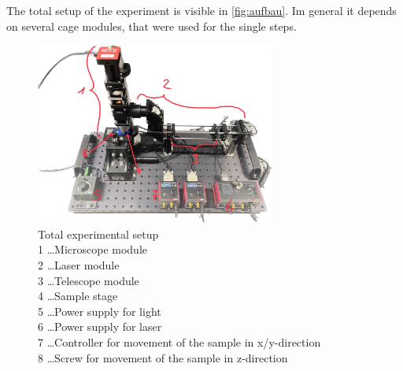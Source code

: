 \documentclass[12pt,english,ngerman]{scrartcl}
\begin{document}
The total setup of the experiment is visible in \autoref{fig:aufbau}. Im
general it depends on several cage modules, that were used for the single
steps.

\begin{figure}[H]
	\begin{center}
		\includegraphics[width =0.7\textwidth]{./figures/aufbau.jpg}
	\end{center}
	\caption[Total experimental setup] { Total experimental setup                                       \\
		1 \dots Microscope module                                      \\
		2 \dots Laser module                                           \\
		3 \dots Telescope module                                       \\
		4 \dots Sample stage                                           \\
		5 \dots Power supply for light                                 \\
		6 \dots Power supply for laser                                 \\
		7 \dots Controller for movement of the sample in x/y-direction \\
		8 \dots Screw for movement of the sample in z-direction
	}\label{fig:aufbau}
\end{figure}
\end{document}
